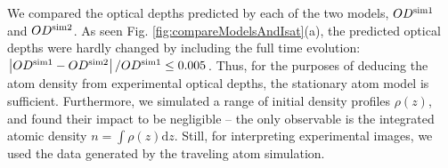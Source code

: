 \documentclass[12pt]{iopart}
\begin{document}
\par We compared the optical depths predicted by each of the two models, $OD^{\rm{sim1}}$ and $OD^{\rm{sim2}}$. As seen Fig. \ref{fig:compareModelsAndIsat}(a), the predicted optical depths were hardly changed by including the full time evolution:  $\left|OD^{\rm{sim1}}-OD^{\rm{sim2}}\right|/OD^{\rm{sim1}} \le 0.005$. Thus, for the purposes of deducing the atom density from experimental optical depths, the stationary atom model is sufficient. Furthermore, we simulated a range of initial density profiles $\rho(z)$, and found their impact to be negligible \--- the only observable is the integrated atomic density $n=\int\rho(z)\mathrm{d}z$. Still, for interpreting experimental images, we used the data generated by the traveling atom simulation.
\begin{figure}

\end{figure}
\end{document}
